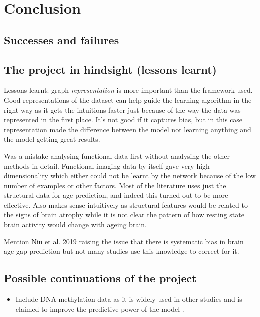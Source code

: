\chapter{Conclusion}


\section{Successes and failures}

\section{The project in hindsight (lessons learnt)}
Lessons learnt: graph \textit{representation} is more important than the framework used. Good representations of the dataset can help guide the learning algorithm in the right way as it gets the intuitions faster just because of the way the data was represented in the first place. It's not good if it captures bias, but in this case representation made the difference between the model not learning anything and the model getting great results.

Was a mistake analysing functional data first without analysing the other methods in detail. Functional imaging data by itself gave very high dimensionality which either could not be learnt by the network because of the low number of examples or other factors. Most of the literature uses just the structural data for age prediction, and indeed this turned out to be more effective. Also makes sense intuitively as structural features would be related to the signs of brain atrophy while it is not clear the pattern of how resting state brain activity would change with ageing brain.

Mention Niu et al. 2019 raising the issue that there is systematic bias in brain age gap prediction but not many studies use this knowledge to correct for it. 


\section{Possible continuations of the project}
\begin{itemize}
    \item Include DNA methylation data as it is widely used in other studies and is claimed to improve the predictive power of the model \cite{cole2018brain}.
\end{itemize}
